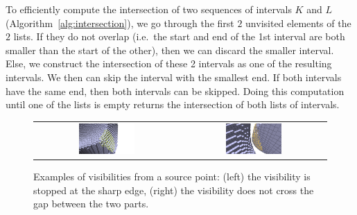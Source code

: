 To efficiently compute the intersection of two sequences of intervals
$K$ and $L$ (Algorithm~\ref{alg:intersection}), we go through the
first $2$ unvisited elements of the $2$ lists. If they do not overlap
(i.e.\ the start and end of the 1st interval are both smaller than the
start of the other), then we can discard the smaller interval. Else,
we construct the intersection of these 2 intervals as one of the
resulting intervals. We then can skip the interval with the smallest
end. If both intervals have the same end, then both intervals can be
skipped. Doing this computation until one of the lists is empty
returns the intersection of both lists of intervals.


\begin{figure}
  \centering
  \begin{tabular}{c c}
    \includegraphics[width=0.4\textwidth]{pictures/visibility_from_given_point_r_10} &
    \includegraphics[width=0.4\textwidth]{pictures/visibility_aware_of_features}
  \end{tabular}
  \caption{Examples of visibilities from a source point:
    (left) the visibility is stopped at the sharp edge, (right) the
    visibility does not cross the gap between the two parts.}
  \label{fig:visibility-results}
\end{figure}
%


